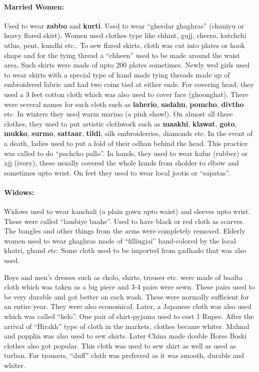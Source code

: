 \paragraph{Married Women:} Used to wear \textbf{zabbo} and \textbf{kurti}. Used
to wear ``gherdar ghaghras'' (chaniyu or heavy flared skirt). Women used clothes
type like chhint, gujj, cheero, kutchchi utlus, pent, kundhi etc.. To sew flared
skirts, cloth was cut into plates or hook shape and for the tying thread a
``chheen'' used to be made around the waist area. Such skirts were made of upto
200 plates sometimes. Newly wed girls used to wear skirts with a special type of
hand made tying threads made up of embroidered fabric and had two coins tied at
either ends. For covering head, they used a 3 feet cotton cloth which was also
used to cover face (ghoonghat). There were several names for such cloth such as
\textbf{laherio}, \textbf{sadahu}, \textbf{pomcho}, \textbf{divtho} etc. In
winters they used warm marino (a pink shawl). On almost all these clothes, they
used to put artistic clothwork such as \textbf{maakhi}, \textbf{klawat},
\textbf{goto}, \textbf{mukko}, \textbf{surmo}, \textbf{sattaar}, \textbf{tildi},
silk embroiderries, diamonds etc. In the event of a death, ladies used to put a
fold of their odhan behind the head. This practice was called to do ``pachcho
pallo''. In hands, they used to wear kafur (rubber) or ajj (ivory), these
usually covered the whole hands from sholder to elbow and sometimes upto wrist.
On feet they used to wear local jootis or ``sapatas''.
\paragraph{Widows:} Widows used to wear kanchali (a plain gown upto waist) and
sleeves upto wrist. These were called ``lambiye baahe''. Used to have black or
red cloth as scarves. The bangles and other things from the arms were completely
removed. Elderly women used to wear ghaghras made of ``fillingiai'' hand-colored
by the local khatri, ghand etc. Some cloth used to be imported from gadhado that
was also used.

Boys and men's dresses such as cholo, shirts, trouser etc. were made of baafta
cloth which was taken as a big piece and 3-4 pairs were sewn. These pairs used
to be very durable and got better on each wash. These were normally sufficient
for an entire year. They were also economical. Later, a Japanese cloth was also
    used which was called ``kelo''. One pair of shirt-pyjama used to cost 1
    Rupee. After the arrival of ``Hirakh'' type of cloth in the markets, clothes
    became whiter. Malmal and popplin was also used to sew shirts. Later China
    made double Horse Boski clothes also got popular. This cloth was used to sew
    shirt as well as used as turban. For trousers, ``duff'' cloth was preferred
    as it was smooth, durable and whiter.

